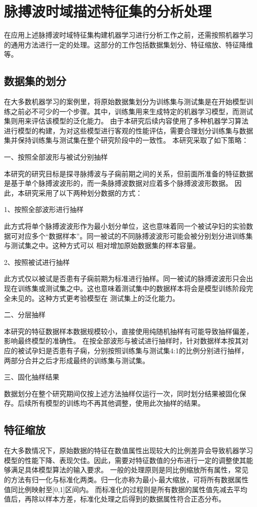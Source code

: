 \section{脉搏波时域描述特征集的分析处理}
在应用上述脉搏波时域特征集构建机器学习进行分析工作之前，还需按照机器学习的通用方法进行一定的处理。这部分的工作包括数据集划分、特征缩放、特征降维等。
\subsection{数据集的划分}
在大多数机器学习的案例里，将原始数据集划分为训练集与测试集是在开始模型训练之前必不可少的一个步骤。其中，训练集用来生成特定的机器学习模型，而测试集则用来评估该模型的泛化能力。
由于本研究后续内容使用了多种机器学习算法进行模型的构建，为对这些模型进行客观的性能评估，需要合理划分训练集与数据集并保持训练集与测试集在整个研究阶段中的一致性。
本研究采取了如下策略：

一、按照全部波形与被试分别抽样

本研究的研究目标是探寻脉搏波与子痫前期之间的关系，但前面所准备的特征数据是基于单个脉搏波波形的，而一条脉搏波数据对应着多个脉搏波波形数据。
因此，本研究采用了以下两种划分数据的方式：

1、按照全部波形进行抽样

此方式将单个脉搏波波形作为最小划分单位，这也意味着同一个被试孕妇的实验数据可对应多个“数据样本”。同一被试的不同脉搏波波形可能会被分别划分进训练集与测试集之中。这种方式可以
相对增加原始数据集的样本容量。

2、按照被试进行抽样

此方式仅以被试是否患有子痫前期为标准进行抽样。同一被试的脉搏波波形只会出现在训练集或测试集之中。这也意味着测试集中的数据样本将会是模型训练阶段完全未见的。这种方式更考验模型在
测试集上的泛化能力。

二、分层抽样

本研究的特征数据样本数据规模较小，直接使用纯随机抽样有可能导致抽样偏差，影响最终模型的准确性\cite{Aurélien2018}。
在按全部波形与被试进行抽样时，针对数据样本按其对应的被试孕妇是否患有子痫，分别按照训练集与测试集4:1\cite{Gholamy2018Why7O}的比例分别进行抽样，两部分合并之后才形成最终的训练集与测试集。

三、固化抽样结果

数据划分在整个研究期间仅按上述方法抽样仅运行一次，同时划分结果被固化保存。后续所有模型的训练均不再其他调整，使用此次抽样的结果。

\subsection{特征缩放}
  在大多数情况下，原始数据的特征在数值属性出现较大的比例差异会导致机器学习模型的性能下降、表现欠佳\cite{Aurélien2018}。因此，需要对特征数值的分布进行一定的调整使其能够满足具体模型算法的输入要求。
  一般的处理原则是同比例缩放所有属性，常见的方法有归一化与标准化两类。归一化亦称为最小-最大缩放，可将所有数据属性值同比例映射至[0,1]区间内。
  而标准化的过程则是所有数据的属性值先减去平均值后，再除以样本方差，标准化处理之后得到的数据属性符合正态分布。

